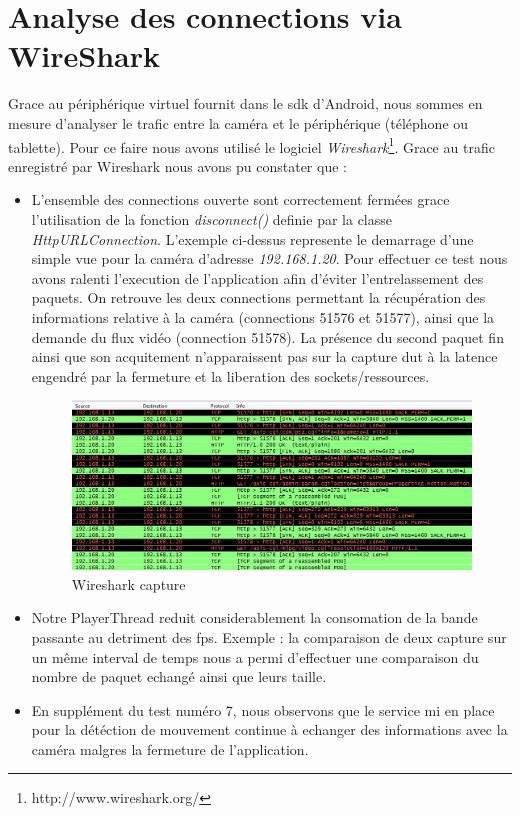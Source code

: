 \section{Analyse des connections via WireShark}
Grace au périphérique virtuel fournit dans le sdk d'Android, nous sommes en
mesure d'analyser le trafic entre la caméra et le périphérique (téléphone ou
tablette). Pour ce faire nous avons utilisé le logiciel
\textit{Wireshark}\footnote{\label{Wireshark}http://www.wireshark.org/}.\newline
Grace au trafic enregistré par Wireshark nous avons pu constater que :
\begin{itemize}
  \item L'ensemble des connections ouverte sont correctement fermées grace
  l'utilisation de la fonction \textit{disconnect()} definie par la classe \textit{HttpURLConnection}.
  L'exemple ci-dessus represente le demarrage d'une simple vue pour la caméra d'adresse
  \textit{192.168.1.20}. Pour effectuer ce test nous avons ralenti l'execution
  de l'application afin d'éviter l'entrelassement des paquets. On retrouve les
  deux connections permettant la récupération des informations relative à la
  caméra (connections 51576 et 51577), ainsi que la demande du flux vidéo
  (connection 51578). La présence du second paquet 
  fin ainsi que son acquitement n'apparaissent pas sur la capture dut à la
  latence engendré par la fermeture et la liberation des sockets/ressources.
\begin{center}
 \begin{figure}[H] 
  \label{finConnection}
  \centering
  \includegraphics[scale=0.6]{Images/finConnection.png}
  \caption{Wireshark capture}
\end{figure}  
\end{center}

  \item Notre PlayerThread reduit considerablement la consomation de la bande
  passante au detriment des fps. Exemple : la comparaison de deux capture sur un
  même interval de temps nous a permi d'effectuer une comparaison du nombre de
  paquet echangé ainsi que leurs taille.
  \item En supplément du test numéro 7,  nous observons que le service mi en
  place pour la détéction de mouvement continue à echanger des informations avec
  la caméra malgres la fermeture de l'application. 
\end{itemize}
